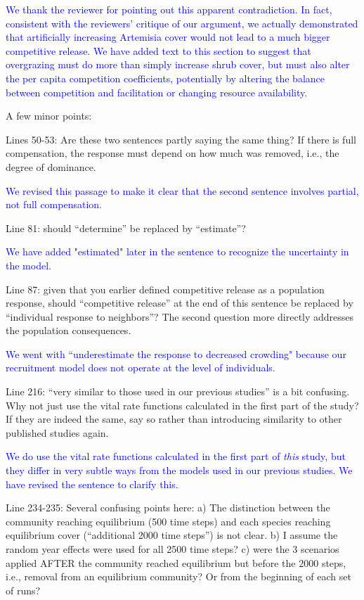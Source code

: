 \documentclass[12pt]{article}
\newcommand{\response}{\textcolor{blue}}
\begin{document}
\response{We thank the reviewer for pointing out this apparent contradiction. In fact, consistent with 
the reviewers' critique of our argument, we actually demonstrated that 
artificially increasing Artemisia cover would not lead to a much bigger competitive release. We have added text to this 
section to suggest that overgrazing must do more than simply increase shrub cover, but must also alter
the per capita competition coefficients, potentially by altering the balance between competition and facilitation
or changing resource availability. }

A few minor points:

Lines 50-53: Are these two sentences partly saying the same thing? If there is full compensation, the
response must depend on how much was removed, i.e., the degree of dominance.

\response{We revised this passage to make it clear that the second sentence involves partial, not full
compensation.}

Line 81: should “determine” be replaced by “estimate”?

\response{We have added "estimated" later in the sentence to recognize the uncertainty in the model.}

Line 87: given that you earlier defined competitive release as a population response, should
“competitive release” at the end of this sentence be replaced by “individual response to neighbors”?
The second question more directly addresses the population consequences.

\response{We went with ``underestimate the response to decreased crowding" because our recruitment model does not operate 
at the level of individuals.}

Line 216: “very similar to those used in our previous studies” is a bit confusing. Why not just use the
vital rate functions calculated in the first part of the study? If they are indeed the same, say so rather
than introducing similarity to other published studies again.

\response{We do use the vital rate functions calculated in the first part of \emph{this} study, but they differ in very subtle ways 
from the models used in our previous studies. We have revised the sentence to clarify this.}

Line 234-235: Several confusing points here: a) The distinction between the community reaching
equilibrium (500 time steps) and each species reaching equilibrium cover (“additional 2000 time steps”)
is not clear. b) I assume the random year effects were used for all 2500 time steps? c) were the 3
scenarios applied AFTER the community reached equilibrium but before the 2000 steps, i.e., removal
from an equilibrium community? Or from the beginning of each set of runs?
\end{document}
